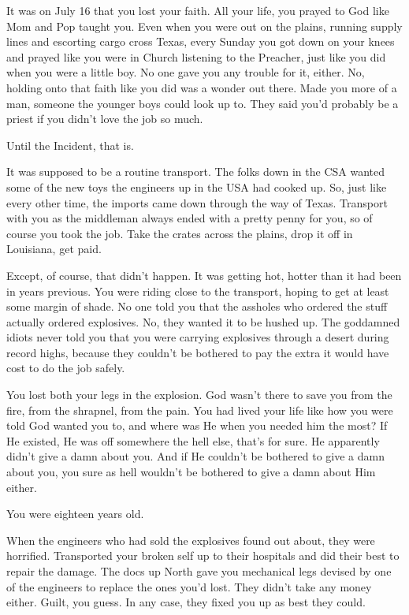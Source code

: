 \documentclass[char]{airship}
\begin{document}
\name{\cCowboy{}}




It was on July 16 that you lost your faith.  All your life, you prayed
to God like Mom and Pop taught you.  Even when you were out on the
plains, running supply lines and escorting cargo cross Texas, every
Sunday you got down on your knees and prayed like you were in Church
listening to the Preacher, just like you did when you were a little
boy.  No one gave you any trouble for it, either.  No, holding onto
that faith like you did was a wonder out there.  Made you more of a
man, someone the younger boys could look up to.  They said you'd
probably be a priest if you didn't love the job so much.

Until the Incident, that is.

It was supposed to be a routine transport.  The folks down in the CSA wanted some of the new toys the engineers up in the USA had cooked up.  So, just like every other time, the imports came down through the way of Texas.  Transport with you as the middleman always ended with a pretty penny for you, so of course you took the job.  Take the crates across the plains, drop it off in Louisiana, get paid.

Except, of course, that didn't happen.  It was getting hot, hotter than it had been in years previous.  You were riding close to the transport, hoping to get at least some margin of shade.  No one told you that the assholes who ordered the stuff actually ordered explosives.  No, they wanted it to be hushed up.  The goddamned idiots never told you that you were carrying explosives through a desert during record highs, because they couldn't be bothered to pay the extra it would have cost to do the job safely.

You lost both your legs in the explosion.  God wasn't there to save
you from the fire, from the shrapnel, from the pain.  You had lived
your life like how you were told God wanted you to, and where was He
when you needed him the most?  If He existed, He was off somewhere the
hell else, that's for sure.  He apparently didn't give a damn about
you.  And if He couldn't be bothered to give a damn about you, you
sure as hell wouldn't be bothered to give a damn about Him either.

You were eighteen years old.

When the engineers who had sold the explosives found out about, they
were horrified.  Transported your broken self up to their hospitals
and did their best to repair the damage.  The docs up North gave you
mechanical legs devised by one of the engineers to replace the ones
you'd lost.  They didn't take any money either.  Guilt, you guess.  In
any case, they fixed you up as best they could.
\end{document}
